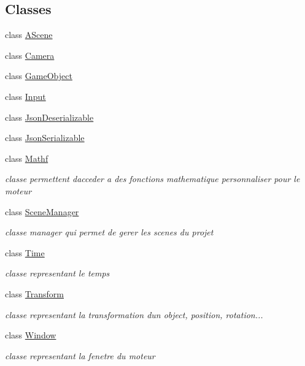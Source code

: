 \subsection*{Classes}
\begin{DoxyCompactItemize}
\item 
class \mbox{\hyperlink{class_beer_engine_1_1_a_scene}{A\+Scene}}
\item 
class \mbox{\hyperlink{class_beer_engine_1_1_camera}{Camera}}
\item 
class \mbox{\hyperlink{class_beer_engine_1_1_game_object}{Game\+Object}}
\item 
class \mbox{\hyperlink{class_beer_engine_1_1_input}{Input}}
\item 
class \mbox{\hyperlink{class_beer_engine_1_1_json_deserializable}{Json\+Deserializable}}
\item 
class \mbox{\hyperlink{class_beer_engine_1_1_json_serializable}{Json\+Serializable}}
\item 
class \mbox{\hyperlink{class_beer_engine_1_1_mathf}{Mathf}}
\begin{DoxyCompactList}\small\item\em classe permettent d\textquotesingle{}acceder a des fonctions mathematique personnaliser pour le moteur \end{DoxyCompactList}\item 
class \mbox{\hyperlink{class_beer_engine_1_1_scene_manager}{Scene\+Manager}}
\begin{DoxyCompactList}\small\item\em classe manager qui permet de gerer les scenes du projet \end{DoxyCompactList}\item 
class \mbox{\hyperlink{class_beer_engine_1_1_time}{Time}}
\begin{DoxyCompactList}\small\item\em classe representant le temps \end{DoxyCompactList}\item 
class \mbox{\hyperlink{class_beer_engine_1_1_transform}{Transform}}
\begin{DoxyCompactList}\small\item\em classe representant la transformation d\textquotesingle{}un object, position, rotation... \end{DoxyCompactList}\item 
class \mbox{\hyperlink{class_beer_engine_1_1_window}{Window}}
\begin{DoxyCompactList}\small\item\em classe representant la fenetre du moteur \end{DoxyCompactList}\end{DoxyCompactItemize}
